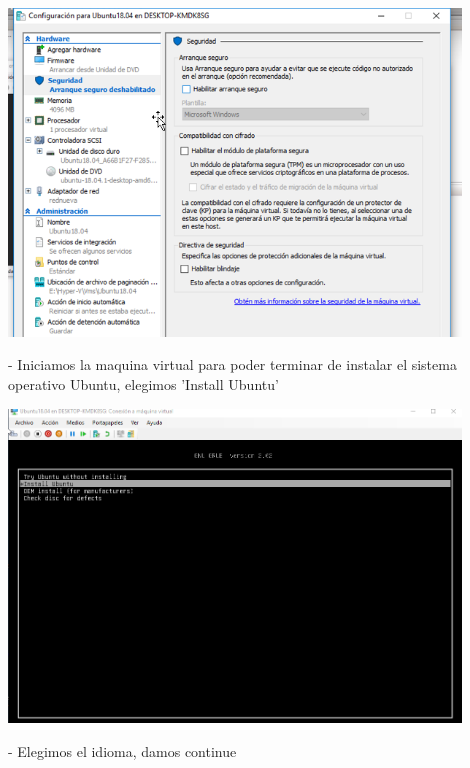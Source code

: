 \documentclass[12pt,letterpaper]{article}
\begin{document}
\begin{center}
	\includegraphics[width=12cm]{./Imagenes/14} 
\end{center}





\begin{itemize}
- Iniciamos la maquina virtual para poder terminar de instalar el sistema operativo Ubuntu, elegimos 'Install Ubuntu'\\
\end{itemize}

\begin{center}
	\includegraphics[width=12cm]{./Imagenes/15} 
\end{center}




\begin{itemize}
- Elegimos el idioma, damos continue\\
\end{itemize}
\end{document}

